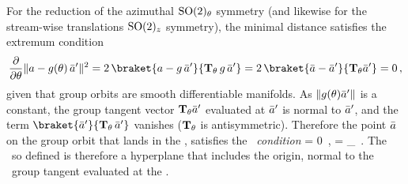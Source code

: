 \documentclass{jfm}
\begin{document}
For the reduction of the azimuthal
$\textrm{SO}(2)_\theta$ symmetry (and likewise for the stream-wise translations
$\textrm{SO}(2)_z$ symmetry), the minimal distance satisfies the extremum
condition
\[
\frac{\partial}{\partial \gSpace} \Norm{\ssp - \LieEl(\gSpace)\,\slicep}^2
   =
2\, \braket{\ssp - \LieEl\,\slicep}{\Lg_\gSpace \,\LieEl\,\slicep}
   =
2\, \braket{\sspRed - \slicep}{\Lg_\gSpace \slicep}
   = 0
    \, ,
\]
given that group orbits are smooth differentiable manifolds.
As $\|{g({\bf \theta})\bar{a}'}\|$ is a constant,
the group tangent vector $\mathbf{T}_{{\bf \theta}} \bar{a}'$
evaluated at $\bar{a}'$
is normal to $\bar{a}'$, and
the term $\braket{\slicep}{\Lg_\theta\,\slicep}$ vanishes
($\mathbf{T}_{\theta}$ is antisymmetric).
Therefore the point $\bar{a}$ on the group
orbit that lands in the \slice, satisfies the \emph{\slice\ condition}
\beq
\braket{\sspRed}{\sliceTan{\theta}} = 0
    \,,\quad
\sliceTan{\theta} = \Lg_\theta \slicep
    \,.
The \slice\ so defined is therefore
a hyperplane that includes the origin,
normal to the \template\ group tangent %
evaluated at the \template.

\end{document}
